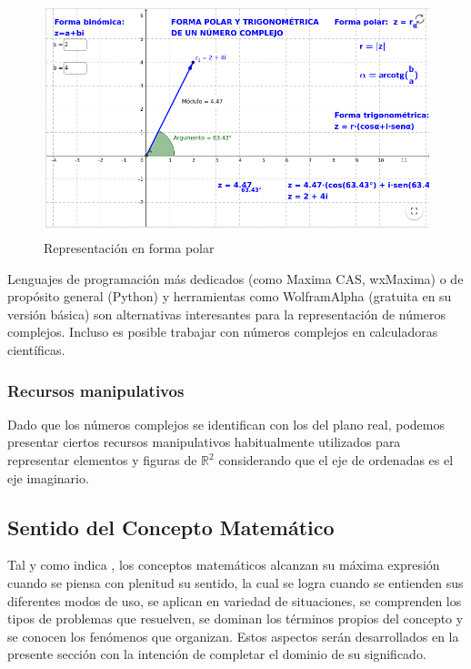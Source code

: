 \documentclass[../main.tex]{memoir}
\begin{document}
\begin{figure}[H]
	\centering
	\includegraphics[scale=0.3]{images/polar.png}
	\caption{Representación en forma polar}
	\label{geogebra3}
\end{figure}

Lenguajes de programación más dedicados (como Maxima CAS, wxMaxima) o de propósito general (Python) y herramientas como WolframAlpha (gratuita en su versión básica) son alternativas interesantes para la representación de números complejos. Incluso es posible trabajar con números complejos en calculadoras científicas.


\subsubsection{Recursos manipulativos}

Dado que los números complejos se identifican con los del plano real, podemos presentar ciertos recursos manipulativos habitualmente utilizados para representar elementos y figuras de $\mathbb{R}^2$ considerando que el eje de ordenadas es el eje imaginario. 
\subsection{Sentido del Concepto Matemático}

Tal y como indica \cite{rico2016}, los conceptos matemáticos alcanzan su máxima expresión cuando se piensa con plenitud su sentido, la cual se logra cuando se entienden sus diferentes modos de uso, se aplican en variedad de situaciones, se comprenden los tipos de problemas que resuelven, se dominan los términos propios del concepto y se conocen los fenómenos que organizan. Estos aspectos serán desarrollados en la presente sección con la intención de completar el dominio de su significado. 
\end{document}
